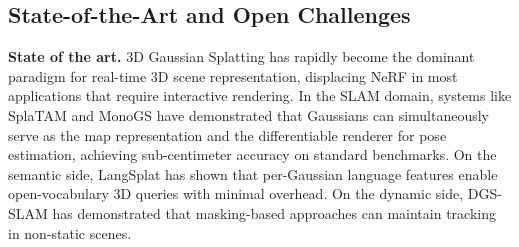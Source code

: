 \documentclass[10pt,twocolumn,letterpaper]{article}
\begin{document}
\subsection{State-of-the-Art and Open Challenges}

\textbf{State of the art.} 3D Gaussian Splatting has rapidly become the dominant paradigm for real-time 3D scene representation, displacing NeRF in most applications that require interactive rendering. In the SLAM domain, systems like SplaTAM and MonoGS have demonstrated that Gaussians can simultaneously serve as the map representation and the differentiable renderer for pose estimation, achieving sub-centimeter accuracy on standard benchmarks. On the semantic side, LangSplat has shown that per-Gaussian language features enable open-vocabulary 3D queries with minimal overhead. On the dynamic side, DGS-SLAM has demonstrated that masking-based approaches can maintain tracking in non-static scenes.
\end{document}
